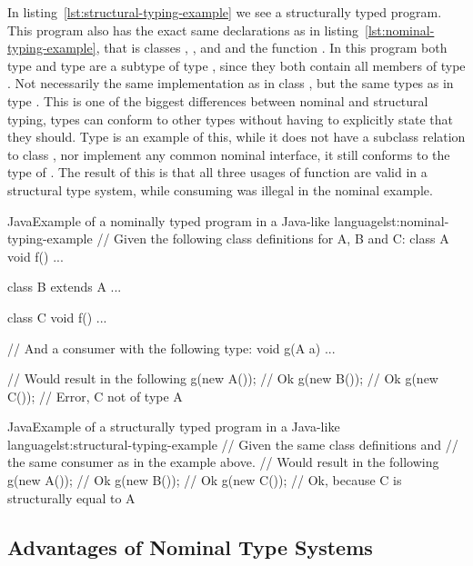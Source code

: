 In listing~\vref{lst:structural-typing-example} we see a structurally typed program.
This program also has the exact same declarations as in listing~\vref{lst:nominal-typing-example}, that is classes , , and  and the function .
In this program both type  and type  are a subtype of type , since they both contain all members of type .
Not necessarily the same implementation as in class , but the same types as in type .
This is one of the biggest differences between nominal and structural typing, types can conform to other types without having to explicitly state that they should.
Type  is an example of this, while it does not have a subclass relation to class , nor implement any common nominal interface, it still conforms to the type of .
The result of this is that all three usages of function  are valid in a structural type system, while consuming  was illegal in the nominal example.


\begin{code}{Java}{Example of a nominally typed program in a Java-like language}{lst:nominal-typing-example}
    // Given the following class definitions for A, B and C:
    class A {
        void f() {
            ...
        }
    }

    class B extends A {
        ...
    }

    class C {
        void f() {
            ...
        }
    }

    // And a consumer with the following type:
    void g(A a) { ... }

    // Would result in the following
    g(new A()); // Ok
    g(new B()); // Ok
    g(new C()); // Error, C not of type A
\end{code}

\begin{code}{Java}{Example of a structurally typed program in a Java-like language}{lst:structural-typing-example}
    // Given the same class definitions and
    // the same consumer as in the example above.
    // Would result in the following
    g(new A()); // Ok
    g(new B()); // Ok
    g(new C()); // Ok, because C is structurally equal to A
\end{code}

\subsection{Advantages of Nominal Type Systems}\label{subsec:advantages-of-nominal-types}

